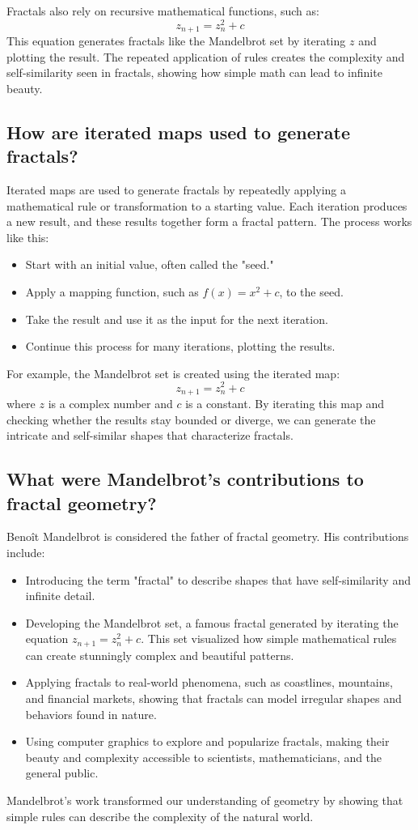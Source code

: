 \documentclass[12pt]{article}
\begin{document}
Fractals also rely on recursive mathematical functions, such as:
\[
z_{n+1} = z_n^2 + c
\]
This equation generates fractals like the Mandelbrot set by iterating \( z \) and plotting the result. The repeated application of rules creates the complexity and self-similarity seen in fractals, showing how simple math can lead to infinite beauty.

\subsection{How are iterated maps used to generate fractals?}
Iterated maps are used to generate fractals by repeatedly applying a mathematical rule or transformation to a starting value. Each iteration produces a new result, and these results together form a fractal pattern. The process works like this:
\begin{itemize}
    \item Start with an initial value, often called the "seed."
    \item Apply a mapping function, such as \( f(x) = x^2 + c \), to the seed.
    \item Take the result and use it as the input for the next iteration.
    \item Continue this process for many iterations, plotting the results.
\end{itemize}

For example, the Mandelbrot set is created using the iterated map:
\[
z_{n+1} = z_n^2 + c
\]
where \( z \) is a complex number and \( c \) is a constant. By iterating this map and checking whether the results stay bounded or diverge, we can generate the intricate and self-similar shapes that characterize fractals.

\subsection{What were Mandelbrot's contributions to fractal geometry?}
Benoît Mandelbrot is considered the father of fractal geometry. His contributions include:
\begin{itemize}
    \item Introducing the term "fractal" to describe shapes that have self-similarity and infinite detail.
    \item Developing the Mandelbrot set, a famous fractal generated by iterating the equation \( z_{n+1} = z_n^2 + c \). This set visualized how simple mathematical rules can create stunningly complex and beautiful patterns.
    \item Applying fractals to real-world phenomena, such as coastlines, mountains, and financial markets, showing that fractals can model irregular shapes and behaviors found in nature.
    \item Using computer graphics to explore and popularize fractals, making their beauty and complexity accessible to scientists, mathematicians, and the general public.
\end{itemize}
Mandelbrot's work transformed our understanding of geometry by showing that simple rules can describe the complexity of the natural world.
\end{document}
